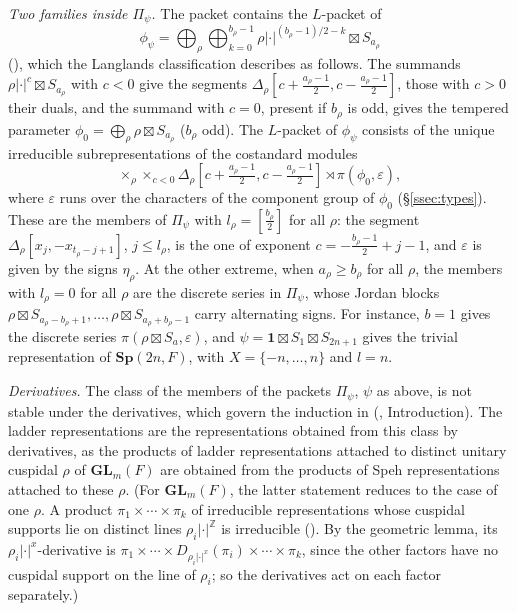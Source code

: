 \documentclass[a4paper,12pt,leqno]{amsart}
\theoremstyle{plain}
\theoremstyle{definition}
\begin{document}
\emph{Two families inside $\Pi_\psi$.} The packet contains the $L$-packet of
\[\phi_\psi=\bigoplus_\rho\bigoplus_{k=0}^{b_\rho-1}\rho|\cdot|^{(b_\rho-1)/2-k}\boxtimes S_{a_\rho}\]
(\cite{Art13}), which the Langlands classification describes as follows. The summands
$\rho|\cdot|^{c}\boxtimes S_{a_\rho}$ with $c<0$ give the segments $\Delta_\rho[c+\frac{a_\rho-1}2,c-\frac{a_\rho-1}2]$,
those with $c>0$ their duals, and the summand with $c=0$, present if $b_\rho$ is odd, gives the tempered
parameter $\phi_0=\bigoplus_\rho\rho\boxtimes S_{a_\rho}$ ($b_\rho$ odd). The $L$-packet of $\phi_\psi$ consists of the
unique irreducible subrepresentations of the costandard modules
\[\mathop{\times}_\rho\mathop{\times}_{c<0}\Delta_\rho[c+\tfrac{a_\rho-1}2,c-\tfrac{a_\rho-1}2]\rtimes\pi(\phi_0,\varepsilon),\]
where
$\varepsilon$ runs over the characters of the component group of $\phi_0$ (\S\ref{ssec:types}). These are
the members of $\Pi_\psi$ with $l_\rho=[\frac{b_\rho}2]$ for all $\rho$: the segment
$\Delta_\rho[x_j,-x_{t_\rho-j+1}]$, $j\leq l_\rho$, is the one of exponent $c=-\frac{b_\rho-1}2+j-1$, and
$\varepsilon$ is given by the signs $\eta_\rho$. At the other extreme, when $a_\rho\geq b_\rho$ for all
$\rho$, the members with $l_\rho=0$ for all $\rho$ are the discrete series in $\Pi_\psi$, whose Jordan
blocks $\rho\boxtimes S_{a_\rho-b_\rho+1},\ldots,\rho\boxtimes S_{a_\rho+b_\rho-1}$ carry alternating
signs. For instance, $b=1$ gives the discrete series $\pi(\rho\boxtimes S_a,\varepsilon)$, and
$\psi=\mathbf 1\boxtimes S_1\boxtimes S_{2n+1}$ gives the trivial representation of $\mathbf{Sp}(2n,F)$, with
$X=\{-n,\ldots,n\}$ and $l=n$.

\emph{Derivatives.} The class of the members of the packets $\Pi_\psi$, $\psi$ as above, is not stable
under the derivatives, which govern the induction in \cite{Ato24} (\cite{Ato24}, Introduction). The
ladder representations are the representations obtained from this class by derivatives, as the
products of ladder representations attached to distinct unitary cuspidal $\rho$ of $\mathbf{GL}_m(F)$ are
obtained from the products of Speh representations attached to these $\rho$. (For $\mathbf{GL}_m(F)$, the
latter statement reduces to the case of one $\rho$. A product $\pi_1\times\cdots\times\pi_k$ of irreducible
representations whose cuspidal supports lie on distinct lines $\rho_i|\cdot|^{\mathbb Z}$ is irreducible
(\cite{Zel80}). By the geometric lemma, its $\rho_i|\cdot|^x$-derivative is $\pi_1\times\cdots\times
D_{\rho_i|\cdot|^x}(\pi_i)\times\cdots\times\pi_k$, since the other factors have no cuspidal support on
the line of $\rho_i$; so the derivatives act on each factor separately.)
\end{document}
